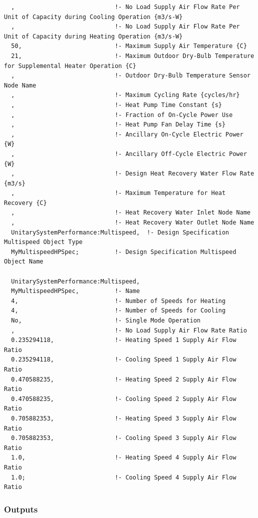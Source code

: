 \begin{lstlisting}
  ,                            !- No Load Supply Air Flow Rate Per Unit of Capacity during Cooling Operation {m3/s-W}
  ,                            !- No Load Supply Air Flow Rate Per Unit of Capacity during Heating Operation {m3/s-W}
  50,                          !- Maximum Supply Air Temperature {C}
  21,                          !- Maximum Outdoor Dry-Bulb Temperature for Supplemental Heater Operation {C}
  ,                            !- Outdoor Dry-Bulb Temperature Sensor Node Name
  ,                            !- Maximum Cycling Rate {cycles/hr}
  ,                            !- Heat Pump Time Constant {s}
  ,                            !- Fraction of On-Cycle Power Use
  ,                            !- Heat Pump Fan Delay Time {s}
  ,                            !- Ancillary On-Cycle Electric Power {W}
  ,                            !- Ancillary Off-Cycle Electric Power {W}
  ,                            !- Design Heat Recovery Water Flow Rate {m3/s}
  ,                            !- Maximum Temperature for Heat Recovery {C}
  ,                            !- Heat Recovery Water Inlet Node Name
  ,                            !- Heat Recovery Water Outlet Node Name
  UnitarySystemPerformance:Multispeed,  !- Design Specification Multispeed Object Type
  MyMultispeedHPSpec;          !- Design Specification Multispeed Object Name

  UnitarySystemPerformance:Multispeed,
  MyMultispeedHPSpec,          !- Name
  4,                           !- Number of Speeds for Heating
  4,                           !- Number of Speeds for Cooling
  No,                          !- Single Mode Operation
  ,                            !- No Load Supply Air Flow Rate Ratio
  0.235294118,                 !- Heating Speed 1 Supply Air Flow Ratio
  0.235294118,                 !- Cooling Speed 1 Supply Air Flow Ratio
  0.470588235,                 !- Heating Speed 2 Supply Air Flow Ratio
  0.470588235,                 !- Cooling Speed 2 Supply Air Flow Ratio
  0.705882353,                 !- Heating Speed 3 Supply Air Flow Ratio
  0.705882353,                 !- Cooling Speed 3 Supply Air Flow Ratio
  1.0,                         !- Heating Speed 4 Supply Air Flow Ratio
  1.0;                         !- Cooling Speed 4 Supply Air Flow Ratio
\end{lstlisting}

\subsubsection{Outputs}\label{outputs-038}

